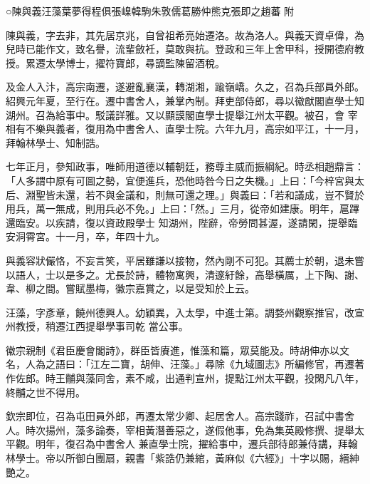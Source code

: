 
\begin{pinyinscope}

 ○陳與義汪藻葉夢得程俱張嵲韓駒朱敦儒葛勝仲熊克張即之趙蕃
 附



 陳與義，字去非，其先居京兆，自曾祖希亮始遷洛。故為洛人。與義天資卓偉，為兒時已能作文，致名譽，流輩斂衽，莫敢與抗。登政和三年上舍甲科，授開德府教授。累遷太學博士，擢符寶郎，尋謫監陳留酒稅。



 及金人入汴，高宗南遷，遂避亂襄漢，轉湖湘，踰嶺嶠。久之，召為兵部員外郎。紹興元年夏，至行在。遷中書舍人，兼掌內制。拜吏部侍郎，尋以徽猷閣直學士知湖州。召為給事中。駁議詳雅。又以顯謨閣直學士提舉江州太平觀。被召，會
 宰相有不樂與義者，復用為中書舍人、直學士院。六年九月，高宗如平江，十一月，拜翰林學士、知制誥。



 七年正月，參知政事，唯師用道德以輔朝廷，務尊主威而振綱紀。時丞相趙鼎言：「人多謂中原有可圖之勢，宜便進兵，恐他時咎今日之失機。」上曰：「今梓宮與太后、淵聖皆未還，若不與金議和，則無可還之理。」與義曰：「若和議成，豈不賢於用兵，萬一無成，則用兵必不免。」上曰：「然。」三月，從帝如建康。明年，扈蹕還臨安。以疾請，復以資政殿學士
 知湖州，陛辭，帝勞問甚渥，遂請閑，提舉臨安洞霄宮。十一月，卒，年四十九。



 與義容狀儼恪，不妄言笑，平居雖謙以接物，然內剛不可犯。其薦士於朝，退未嘗以語人，士以是多之。尤長於詩，體物寓興，清邃紆餘，高舉橫厲，上下陶、謝、韋、柳之間。嘗賦墨梅，徽宗嘉賞之，以是受知於上云。



 汪藻，字彥章，饒州德興人。幼穎異，入太學，中進士第。調婺州觀察推官，改宣州教授，稍遷江西提舉學事司乾
 當公事。



 徽宗親制《君臣慶會閣詩》，群臣皆賡進，惟藻和篇，眾莫能及。時胡伸亦以文名，人為之語曰：「江左二寶，胡伸、汪藻。」尋除《九域圖志》所編修官，再遷著作佐郎。時王黼與藻同舍，素不咸，出通判宣州，提點江州太平觀，投閑凡八年，終黼之世不得用。



 欽宗即位，召為屯田員外郎，再遷太常少卿、起居舍人。高宗踐祚，召試中書舍人。時次揚州，藻多論奏，宰相黃潛善惡之，遂假他事，免為集英殿修撰、提舉太平觀。明年，復召為中書舍人
 兼直學士院，擢給事中，遷兵部待郎兼侍講，拜翰林學士。帝以所御白團扇，親書「紫誥仍兼綰，黃麻似《六經》」十字以賜，縉紳艷之。




\end{pinyinscope}
